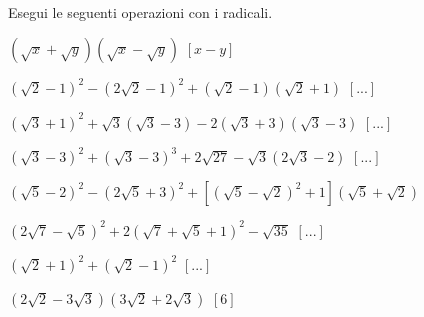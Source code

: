 

\begin{esercizio}[\Ast]
 \label{ese:2.59}
Esegui le seguenti operazioni con i radicali.
 \begin{enumeratea}
 \item $(\sqrt x+\sqrt y)(\sqrt x-\sqrt y)$
  \hfill $\left[x-y\right]$
 \item $(\sqrt 2-1)^2-(2\sqrt 2-1)^2+(\sqrt 2-1)(\sqrt 2+1)$
  \hfill $\left[...\right]$
 \item $(\sqrt 3+1)^2+\sqrt 3(\sqrt 3-3)-2(\sqrt 3+3)(\sqrt 3-3)$
  \hfill $\left[...\right]$
 \item $(\sqrt 3-3)^2+(\sqrt 3-3)^3+2\sqrt{27}-\sqrt 3(2\sqrt 3-2)$
  \hfill $\left[...\right]$
 \item $(\sqrt 5-2)^2-(2\sqrt 5+3)^2+\left[(\sqrt 5-\sqrt 2)^2+1\right]
        (\sqrt 5+\sqrt 2)$
 \item $(2\sqrt 7-\sqrt 5)^2+2(\sqrt 7+\sqrt 5+1)^2-\sqrt{35}$
  \hfill $\left[...\right]$
 \item $(\sqrt 2+1)^2+(\sqrt 2-1)^2$
  \hfill $\left[...\right]$
 \item $(2\sqrt 2-3\sqrt 3)(3\sqrt 2+2\sqrt 3)$
  \hfill $\left[6\right]$
 \end{enumeratea}
\end{esercizio}


